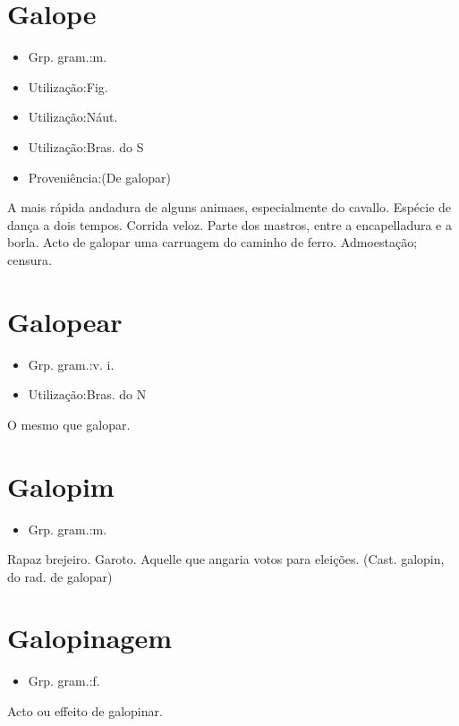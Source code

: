 \section{Galope}
\begin{itemize}
\item {Grp. gram.:m.}
\end{itemize}
\begin{itemize}
\item {Utilização:Fig.}
\end{itemize}
\begin{itemize}
\item {Utilização:Náut.}
\end{itemize}
\begin{itemize}
\item {Utilização:Bras. do S}
\end{itemize}
\begin{itemize}
\item {Proveniência:(De \textunderscore galopar\textunderscore )}
\end{itemize}
A mais rápida andadura de alguns animaes, especialmente do cavallo.
Espécie de dança a dois tempos.
Corrida veloz.
Parte dos mastros, entre a encapelladura e a borla.
Acto de galopar uma carruagem do caminho de ferro.
Admoestação; censura.
\section{Galopear}
\begin{itemize}
\item {Grp. gram.:v. i.}
\end{itemize}
\begin{itemize}
\item {Utilização:Bras. do N}
\end{itemize}
O mesmo que \textunderscore galopar\textunderscore .
\section{Galopim}
\begin{itemize}
\item {Grp. gram.:m.}
\end{itemize}
Rapaz brejeiro.
Garoto.
Aquelle que angaria votos para eleições.
(Cast. \textunderscore galopin\textunderscore , do rad. de \textunderscore galopar\textunderscore )
\section{Galopinagem}
\begin{itemize}
\item {Grp. gram.:f.}
\end{itemize}
Acto ou effeito de galopinar.
